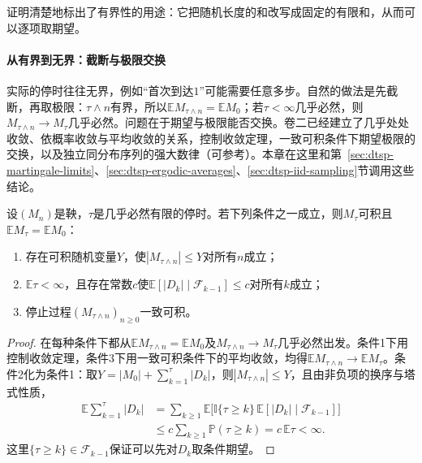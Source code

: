 证明清楚地标出了有界性的用途：它把随机长度的和改写成固定的有限和，从而可以逐项取期望。

\paragraph{从有界到无界：截断与极限交换}
实际的停时往往无界，例如“首次到达$1$”可能需要任意多步。自然的做法是先截断，再取极限：$\tau\wedge n$有界，所以$\mathbb EM_{\tau\wedge n}=\mathbb EM_0$；若$\tau<\infty$几乎必然，则$M_{\tau\wedge n}\to M_\tau$几乎必然。问题在于期望与极限能否交换。卷二已经建立了几乎处处收敛、依概率收敛与平均收敛的关系，控制收敛定理，一致可积条件下期望极限的交换，以及独立同分布序列的强大数律（可参考）。本章在这里和第~\ref{sec:dtsp-martingale-limits}、\ref{sec:dtsp-ergodic-averages}、\ref{sec:dtsp-iid-sampling}节调用这些结论。

\begin{theorem}[可选停止]
  \label{thm:dtsp-optional-stopping}
  设$(M_n)$是鞅，$\tau$是几乎必然有限的停时。若下列条件之一成立，则$M_\tau$可积且$\mathbb EM_\tau=\mathbb EM_0$：
  \begin{enumerate}
    \item 存在可积随机变量$Y$，使$|M_{\tau\wedge n}|\leq Y$对所有$n$成立；
    \item $\mathbb E\tau<\infty$，且存在常数$c$使$\mathbb E[|D_k|\mid\mathcal F_{k-1}]\leq c$对所有$k$成立；
    \item 停止过程$(M_{\tau\wedge n})_{n\geq0}$一致可积。
  \end{enumerate}
\end{theorem}

\begin{proof}
在每种条件下都从$\mathbb EM_{\tau\wedge n}=\mathbb EM_0$及$M_{\tau\wedge n}\to M_\tau$几乎必然出发。条件1下用控制收敛定理，条件3下用一致可积条件下的平均收敛，均得$\mathbb EM_{\tau\wedge n}\to\mathbb EM_\tau$。条件2化为条件1：取$Y=|M_0|+\sum_{k=1}^{\tau}|D_k|$，则$|M_{\tau\wedge n}|\leq Y$，且由非负项的换序与塔式性质，
\[
  \begin{aligned}
    \mathbb E\sum_{k=1}^{\tau}|D_k|&=\sum_{k\geq1}\mathbb E\bigl[\mathbb I\{\tau\geq k\}\,\mathbb E[|D_k|\mid\mathcal F_{k-1}]\bigr]\\
    &\leq c\sum_{k\geq1}\mathbb P(\tau\geq k)=c\,\mathbb E\tau<\infty.
  \end{aligned}
\]
这里$\{\tau\geq k\}\in\mathcal F_{k-1}$保证可以先对$D_k$取条件期望。
\end{proof}

